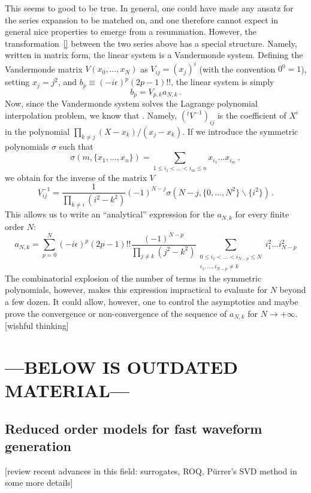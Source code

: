 \documentclass[aps,showpacs,%
prd,superscriptaddress,nofootinbib]{revtex4}
\newcommand{\be}{\begin{equation}}
\newcommand{\ee}{\end{equation}}
\begin{document}
This seems to good to be true. In general, one could have made any ansatz for the series expansion to be matched on, and one therefore cannot expect in general nice properties to emerge from a resummation. However, the transformation~\eqref{} between the two series above has a special structure. Namely, written in matrix form, the linear system is a Vandermonde system. Defining the Vandermonde matrix $V(x_{0},\dots,x_{N})$ as $V_{ij} = (x_{j})^{i}$ (with the convention $0^{0} = 1$), setting $x_{j} = j^{2}$, and $b_{p} \equiv (-i\epsilon)^{p}(2p-1)!!$, the linear system is simply
%
\be
	b_{p} = V_{p,k} a_{N,k} \,.
\ee
%
Now, since the Vandermonde system solves the Lagrange polynomial interpolation problem, we know that . Namely, $({}^{t}V^{-1})_{ij}$ is the coefficient of $X^{i}$ in the polynomial $\prod_{k\neq j} (X-x_{k})/(x_{j} - x_{k})$. If we introduce the symmetric polynomials $\sigma$ such that
%
\be	
	\sigma(m, \{x_{1}, \dots, x_{n}\}) = \sum\limits_{1\leq i_{1}<\dots<i_{m}\leq n} x_{i_{1}}\dots x_{i_{m}} \,,
\ee
%
we obtain for the inverse of the matrix $V$
%
\be
	V^{-1}_{ij} = \frac{1}{\prod_{k\neq i} (i^{2} - k^{2})} (-1)^{N-j} \sigma(N-j, \{0,\dots,N^{2}\}\backslash \{i^{2}\}) \,.
\ee
%
This allows us to write an ``analytical'' expression for the $a_{N,k}$ for every finite order $N$:
%
\be
	a_{N,k} = \sum\limits_{p=0}^{N} (-i\epsilon)^{p}(2p-1)!! \frac{(-1)^{N-p}}{\prod_{j\neq k} (j^{2}-k^{2})} \sum\limits_{\substack{ 0 \leq i_{1} < \dots < i_{N-p} \leq N \\ i_{1}, \dots, i_{N-p} \neq k}} i_{1}^{2}\dots i_{N-p}^{2}
\ee
%
The combinatorial explosion of the number of terms in the symmetric polynomials, however, makes this expression impractical to evaluate for $N$ beyond a few dozen. It could allow, however, one to control the asymptotics and maybe prove the convergence or non-convergence of the sequence of $a_{N,k}$ for $N\rightarrow +\infty$. [wishful thinking]

\section*{---BELOW IS OUTDATED MATERIAL---}


\subsection{Reduced order models for fast waveform generation}
\label{subsec:rom}

[review recent advances in this field: surrogates, ROQ, P\"urrer's SVD method in some more details]
\end{document}

